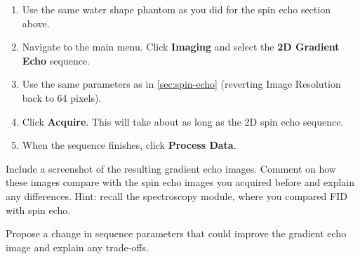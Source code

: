 \begin{enumerate}
\item	Use the same water shape phantom as you did for the spin echo section above.
\item   Navigate to the main menu. Click \textbf{Imaging} and select the \textbf{2D Gradient Echo} sequence.
\item   Use the same parameters as in \ref{sec:spin-echo} (reverting Image Resolution back to 64 pixels).
\item   Click \textbf{Acquire}. This will take about as long as the 2D spin echo sequence.
\item   When the sequence finishes, click \textbf{Process Data}.
\end{enumerate}

\noindent{}\color{red}Include a screenshot of the resulting gradient echo images. Comment on how these images compare with the spin echo images you acquired before and explain any differences. Hint: recall the spectroscopy module, where you compared FID with spin echo.

Propose a change in sequence parameters that could improve the gradient echo image and explain any trade-offs.
\noindent{}\color{black}
